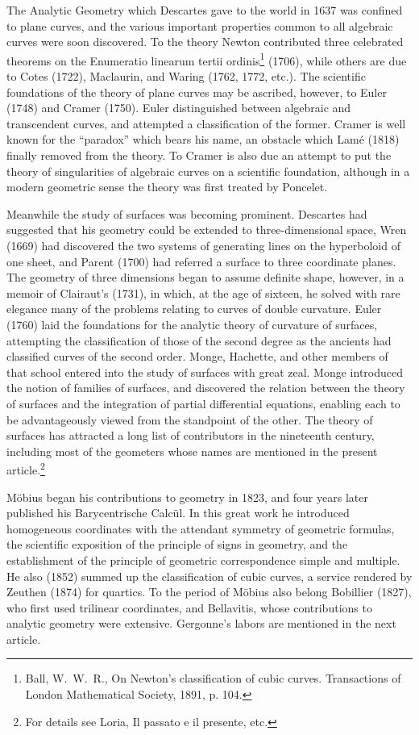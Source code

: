 \documentclass[oneside]{book}
\begin{document}
{The Analytic Geometry which Descartes gave to the world in 1637 was
confined to plane curves, and the various important properties
common to all algebraic curves were soon discovered. To the theory
Newton contributed three celebrated theorems on the Enumeratio
linearum tertii ordinis\footnote{Ball, W.~W.~R., On Newton's
classification of cubic curves. Transactions of London Mathematical
Society, 1891, p. 104.} (1706), while others are due to Cotes
(1722), Maclaurin, and Waring (1762, 1772, etc.). The scientific
foundations of the theory of plane curves may be ascribed, however,
to Euler (1748) and Cramer (1750). Euler distinguished between
algebraic and transcendent curves, and attempted a classification of
the former. Cramer is well known for the ``paradox'' which bears his
name, an obstacle which Lam\'e (1818) finally removed from the
theory. To Cramer is also due an attempt to put the theory of
singularities of algebraic curves on a scientific foundation,
although in a modern geometric sense the theory was first treated by
Poncelet.

Meanwhile the study of surfaces was becoming prominent. Descartes
had suggested that his geometry could be extended to
three-dimensional space, Wren (1669) had discovered the two systems
of generating lines on the hyperboloid of one sheet, and Parent
(1700) had referred a surface to three coordinate planes. The
geometry of three dimensions began to assume definite shape,
however, in a memoir of Clairaut's (1731), in which, at the age of
sixteen, he solved with rare elegance many of the problems relating
to curves of double curvature. Euler (1760) laid the foundations
for the analytic theory of curvature of surfaces, attempting the
classification of those of the second degree as the ancients had
classified curves of the second order. Monge, Hachette, and other
members of that school entered into the study of surfaces with great
zeal. Monge introduced the notion of families of surfaces, and
discovered the relation between the theory of surfaces and the
integration of partial differential equations, enabling each to be
advantageously viewed from the standpoint of the other. The theory
of surfaces has attracted a long list of contributors in the
nineteenth century, including most of the geometers whose names are
mentioned in the present article.\footnote{For details see Loria,
Il passato e il presente, etc.}

M\"obius began his contributions to geometry in 1823, and four years
later published his Barycentrische Calc\"ul. In this great work he
introduced homogeneous coordinates with the attendant symmetry of
geometric formulas, the scientific exposition of the principle of
signs in geometry, and the establishment of the principle of
geometric correspondence simple and multiple. He also (1852) summed
up the classification of cubic curves, a service rendered by
Zeuthen (1874) for quartics. To the period of M\"obius also belong
Bobillier (1827), who first used trilinear coordinates, and
Bellavitis, whose contributions to analytic geometry were
extensive. Gergonne's labors are mentioned in the next article.

}
\end{document}
